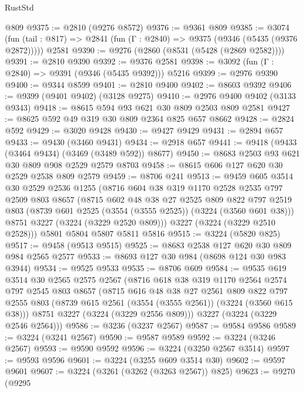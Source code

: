 \begin{lexlean}{RustStd}
\begin{coremodule}
    @809
@9375 := @2810 (@9276 @8572)
@9376 := @9361 @809
@9385 := @3074
    (fun (tail : @817) => @2841 (fun (Γ : @2840) => @9375 (@9346 (@5435 (@9376 @2872)))))
    @2581
@9390 := @9276 (@2860 (@8531 (@5428 (@2869 @2582))))
@9391 := @2810 @9390
@9392 := @9376 @2581
@9398 := @3092 (fun (Γ : @2840) => @9391 (@9346 (@5435 @9392))) @5216
@9399 := @2976 @9390
@9400 := @9344 @8599
@9401 := @2810 @9400
@9402 := @8603 @9392
@9406 := @9399 (@9401 @9402) (@3128 @9275)
@9410 := @2976 @9400 @9402 (@3133 @9343)
@9418 := @8615 @594 @93 @621 @30 @809 @2503 @809 @2581
@9427 := @8625 @592 @49 @319 @30 @809 @2364 @825 @657 @8662
@9428 := @2824 @592
@9429 := @3020 @9428
@9430 := @9427 @9429
@9431 := @2894 @657
@9433 := @9430 (@3460 @9431)
@9434 := @2918 @657
@9441 := @9418 (@9433 (@3464 @9434) (@3469 (@3489 @592)) @8677)
@9450 := @8683 @2503 @93 @621 @30 @809 @908 @2529 @2579 @8703
@9458 := @8615 @606 @127 @620 @30 @2529 @2538 @809 @2579
@9459 := @8706 @241
@9513 := @9459
    @605
    @3514
    @30
    @2529
    @2536
    @1255
    (@8716
      @604
      @38
      @319
      @1170
      @2528
      @2535
      @797
      @2509
      @803
      @8657
      (@8715
        @602
        @48
        @38
        @27
        @2525
        @809
        @822
        @797
        @2519
        @803
        (@8739 @601 @2525 (@3554 (@3555 @2525)) (@3224 (@3560 @601 @38)))
        @8751
        @3227
        (@3224 (@3229 @2520 @809)))
      @3227
      (@3224 (@3229 @2510 @2528)))
    @5801
    @5804
    @5807
    @5811
    @5816
@9515 := @3224 (@5820 @825)
@9517 := @9458 (@9513 @9515)
@9525 := @8683 @2538 @127 @620 @30 @809 @984 @2565 @2577
@9533 := @8693 @127 @30 @984 (@8698 @124 @30 @983 @3944)
@9534 := @9525 @9533
@9535 := @8706 @609
@9584 := @9535
    @619
    @3514
    @30
    @2565
    @2575
    @2567
    (@8716
      @618
      @38
      @319
      @1170
      @2564
      @2574
      @797
      @2545
      @803
      @8657
      (@8715
        @616
        @48
        @38
        @27
        @2561
        @809
        @822
        @797
        @2555
        @803
        (@8739 @615 @2561 (@3554 (@3555 @2561)) (@3224 (@3560 @615 @38)))
        @8751
        @3227
        (@3224 (@3229 @2556 @809)))
      @3227
      (@3224 (@3229 @2546 @2564)))
@9586 := @3236 (@3237 @2567)
@9587 := @9584 @9586
@9589 := @3224 (@3241 @2567)
@9590 := @9587 @9589
@9592 := @3224 (@3246 @2567)
@9593 := @9590 @9592
@9596 := @3224 (@3250 @2567 @3514)
@9597 := @9593 @9596
@9601 := @3224 (@3255 @609 @3514 @30)
@9602 := @9597 @9601
@9607 := @3224 (@3261 (@3262 (@3263 @2567)) @825)
@9623 := @9270
    (@9295

\end{coremodule}
\end{lexlean}
